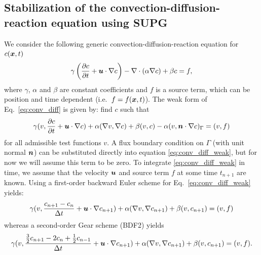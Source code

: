 \subsection{Stabilization of the convection-diffusion-reaction equation using SUPG}
\label{sec:convdiffsupg}

We consider the following generic convection-diffusion-reaction equation for 
$c(\boldsymbol{x}, t)$
\begin{equation}
  \gamma \left( \dfrac{\partial c}{\partial t} + \boldsymbol{u} \cdot \nabla c \right) - \nabla \cdot 
  (\alpha \nabla c) + \beta c = f, \label{eq:conv_diff}
\end{equation}
where $\gamma$, $\alpha$ and $\beta$ are constant coefficients and $f$ is a 
source 
term, which can be position and time dependent (i.e.~$f=f(\boldsymbol{x},t)$). The 
weak form of Eq.~\eqref{eq:conv_diff} is given by: find $c$ such that
\begin{equation}
  \gamma (v, \dfrac{\partial c}{\partial t}+\boldsymbol{u} \cdot \nabla c) + \alpha (\nabla v, \nabla 
  c)+\beta(v,c)-\alpha (v, \boldsymbol{n} \cdot \nabla c)_\Gamma = (v, f ) 
  \label{eq:conv_diff_weak}
\end{equation}
for all admissible test functions $v$. A flux boundary condition on 
$\Gamma$ (with unit normal $\boldsymbol{n}$) can be substituted directly into equation 
\eqref{eq:conv_diff_weak}, but for now we will assume this term to be zero.
To integrate \eqref{eq:conv_diff_weak} in time, we assume that the velocity 
$\boldsymbol{u}$ and 
source term $f$ at some time $t_{n+1}$ are known. Using a 
first-order backward
Euler scheme for Eq.~\eqref{eq:conv_diff_weak} yields:
\begin{equation}
  \gamma (v, \frac{c_{n+1}-c_n}{\Delta t}+\boldsymbol{u} \cdot \nabla c_{n+1}) + \alpha 
  (\nabla v, \nabla c_{n+1}) +\beta(v,c_{n+1})= (v, f ) 
  \label{eq:conv_diff_euler}
\end{equation}
whereas a second-order Gear scheme (BDF2) yields
\begin{equation}
  \gamma (v, \frac{\frac{3}{2}c_{n+1}-2c_n+\frac{1}{2}c_{n-1}}{\Delta t}+\boldsymbol{u} 
  \cdot \nabla c_{n+1}) + \alpha (\nabla v, \nabla c_{n+1}) +\beta(v,c_{n+1})= (v, f ). 
  \label{eq:conv_diff_gear}
\end{equation}

